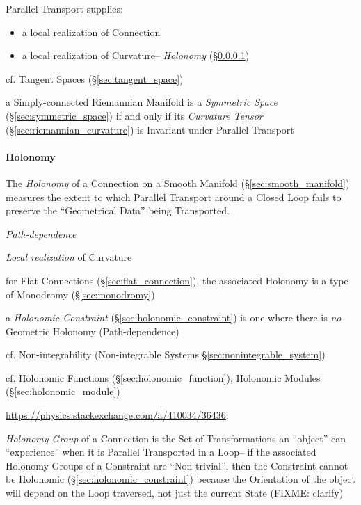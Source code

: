 Parallel Transport supplies:
\begin{itemize}
  \item a local realization of Connection
  \item a local realization of Curvature-- \emph{Holonomy}
    (\S\ref{sec:holonomy})
\end{itemize}

\fist cf. Tangent Spaces (\S\ref{sec:tangent_space})

a Simply-connected Riemannian Manifold is a \emph{Symmetric Space}
(\S\ref{sec:symmetric_space}) if and only if its \emph{Curvature Tensor}
(\S\ref{sec:riemannian_curvature}) is Invariant under Parallel Transport



\paragraph{Holonomy}\label{sec:holonomy}\hfill

The \emph{Holonomy} of a Connection on a Smooth Manifold
(\S\ref{sec:smooth_manifold}) measures the extent to which Parallel Transport
around a Closed Loop fails to preserve the ``Geometrical Data'' being
Transported.

\emph{Path-dependence}

\emph{Local realization} of Curvature

for Flat Connections (\S\ref{sec:flat_connection}), the associated Holonomy is
a type of Monodromy (\S\ref{sec:monodromy})

a \emph{Holonomic Constraint} (\S\ref{sec:holonomic_constraint}) is one where
there is \emph{no} Geometric Holonomy (Path-dependence)

cf. Non-integrability (Non-integrable Systems \S\ref{sec:nonintegrable_system})

\fist cf. Holonomic Functions (\S\ref{sec:holonomic_function}), Holonomic
Modules (\S\ref{sec:holonomic_module})

\url{https://physics.stackexchange.com/a/410034/36436}:

\emph{Holonomy Group} of a Connection is the Set of Transformations an
``object'' can ``experience'' when it is Parallel Transported in a Loop-- if
the associated Holonomy Groups of a Constraint are ``Non-trivial'', then the
Constraint cannot be Holonomic (\S\ref{sec:holonomic_constraint}) because the
Orientation of the object will depend on the Loop traversed, not just the
current State (FIXME: clarify)



